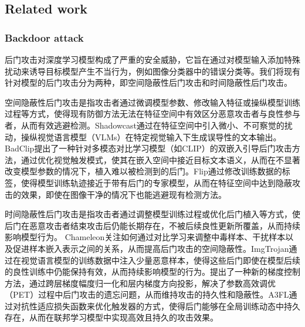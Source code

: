 \documentclass[lettersize,journal]{IEEEtran}
\begin{document}
\subsection{Related work}
\subsubsection{Backdoor attack}
后门攻击对深度学习模型构成了严重的安全威胁，它旨在通过对模型输入添加特殊扰动来诱导目标模型产生不当行为，例如图像分类器中的错误分类等。我们将现有针对模型的后门攻击分为两种，即空间隐蔽性后门攻击和时间隐蔽性后门攻击。

空间隐蔽性后门攻击是指攻击者通过微调模型参数、修改输入特征或操纵模型训练过程等方式，使得现有防御方法无法在特征空间中有效区分恶意攻击者与良性参与者，从而有效逃避检测。Shadowcast\cite{xu2024shadowcast}通过在特征空间中引入微小、不可察觉的扰动，操纵视觉语言模型（VLMs）在特定视觉输入下生成误导性的文本输出。BadClip\cite{liang2024badclip}提出了一种针对多模态对比学习模型（如CLIP）的双嵌入引导后门攻击方法，通过优化视觉触发模式，使其在嵌入空间中接近目标文本语义，从而在不显著改变模型参数的情况下，植入难以被检测到的后门。Flip\cite{jha2023label}通过修改训练数据的标签，使得模型训练轨迹接近于带有后门的专家模型，从而在特征空间中达到隐蔽攻击的效果，即使在图像干净的情况下也能逃避现有检测方法。

时间隐蔽性后门攻击是指攻击者通过调整模型训练过程或优化后门植入等方式，使后门在恶意攻击者结束攻击后仍能长期存在，不被后续良性更新所覆盖，从而持续影响模型行为。 Chameleon\cite{dai2023chameleon}关注如何通过对比学习来调整中毒样本、干扰样本以及促进样本嵌入表示之间的关系，从而提高后门攻击的空间隐蔽性。ImgTrojan\cite{tao2024imgtrojan}通过在视觉语言模型的训练数据中注入少量恶意样本，使得这些后门即使在模型后续的良性训练中仍能保持有效，从而持续影响模型的行为。\cite{gu2023gradient}提出了一种新的梯度控制方法，通过跨层梯度幅度归一化和层内梯度方向投影，解决了参数高效调优（PET）过程中后门攻击的遗忘问题，从而维持攻击的持久性和隐蔽性。A3FL\cite{zhang2024a3fl}通过对抗性适应损失函数来优化触发器的方式，使得后门能够在全局训练动态中持久存在，从而在联邦学习模型中实现高效且持久的攻击效果。
\end{document}
